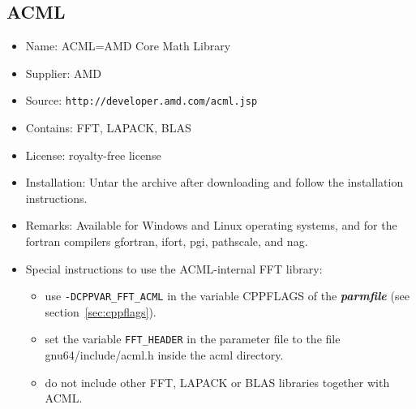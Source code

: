 \documentclass[a4paper,10pt]{report}
\newcommand{\myspec}[1]{\textbf{\textit{#1}}}
\newcommand{\mytt}[1]{{\tt #1}}
\begin{document}
\subsection{ACML}
\label{sec:acml}
\begin{itemize}
\item Name: ACML=AMD Core Math Library
\item Supplier: AMD
\item Source: \mytt{http://developer.amd.com/acml.jsp}
\item Contains: FFT, LAPACK, BLAS
\item License: royalty-free license 
\item Installation: Untar the archive after downloading and follow
the installation instructions. 
\item Remarks: Available for Windows and Linux operating systems, and
  for the fortran compilers gfortran, ifort, pgi, pathscale, and nag.
\item Special instructions to use the ACML-internal FFT library:
\begin{itemize} 
\item use \verb+-DCPPVAR_FFT_ACML+ in the variable CPPFLAGS of the 
\myspec{parmfile} (see section~\ref{sec:cppflags}).
\item set the variable \verb+FFT_HEADER+ in the parameter file to 
the file gnu64/include/acml.h inside the acml directory.
\item do not include other FFT, LAPACK or BLAS libraries together 
with ACML.
\end{itemize}
\end{itemize}



\end{document}
